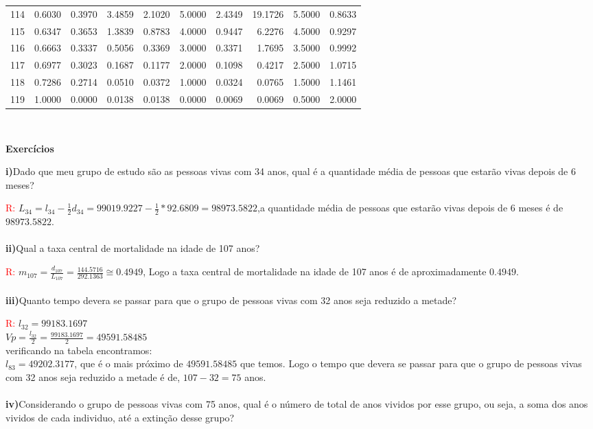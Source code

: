 \documentclass[11pt]{article}
\begin{document}
\begin{tabular}{|r|r|r|r|r|r|r|r|r|r|}
114 & 0.6030 & 0.3970 &      3.4859 &    2.1020 &   5.0000 &     2.4349 &       19.1726 &   5.5000 & 0.8633 \\
115 & 0.6347 & 0.3653 &      1.3839 &    0.8783 &   4.0000 &     0.9447 &        6.2276 &   4.5000 & 0.9297 \\
116 & 0.6663 & 0.3337 &      0.5056 &    0.3369 &   3.0000 &     0.3371 &        1.7695 &   3.5000 & 0.9992 \\
117 & 0.6977 & 0.3023 &      0.1687 &    0.1177 &   2.0000 &     0.1098 &        0.4217 &   2.5000 & 1.0715 \\
118 & 0.7286 & 0.2714 &      0.0510 &    0.0372 &   1.0000 &     0.0324 &        0.0765 &   1.5000 & 1.1461 \\
119 & 1.0000 & 0.0000 &      0.0138 &    0.0138 &   0.0000 &     0.0069 &        0.0069 &   0.5000 & 2.0000 \\
 	\hline
 \end{tabular}
 \\
 \begin{center}
	\textbf{Exercícios}
 \end{center}
 \textbf{i)}Dado que meu grupo de estudo são as pessoas vivas com 34 anos, qual é a quantidade média de pessoas que estarão vivas depois de 6 meses?
 
 \textcolor{red}{R:}
 $L_{34}=l_{34}-\frac{1}{2}d_{34}=99019.9227-\frac{1}{2}*92.6809=98973.5822$,a quantidade média de pessoas que estarão vivas depois de 6 meses é de $98973.5822$.\\
 \\
 \textbf{ii)}Qual a taxa central de mortalidade na idade de 107 anos?
 
 \textcolor{red}{R:}
 $m_{107}=\frac{d_{107}}{L_{107}}=\frac{144.5716}{292.1363}\cong0.4949$, Logo a taxa central de mortalidade na idade de 107 anos é de aproximadamente $0.4949$.\\
 \\
 \textbf{iii)}Quanto tempo devera se passar para que o grupo de pessoas vivas com 32 anos seja reduzido a metade?
 
 \textcolor{red}{R:}
 $l_{32}=99183.1697$\\
 $Vp=\frac{l_{32}}{2}=\frac{99183.1697}{2}=49591.58485$\\verificando na tabela encontramos:\\$l_{83}=49202.3177$, que é o mais próximo de $49591.58485$  que temos. Logo o tempo que devera se passar para que o grupo de pessoas vivas com 32 anos seja reduzido a metade é de, $107-32=75$ anos.\\
 \\
 \textbf{iv)}Considerando o grupo de pessoas vivas com 75 anos, qual é o número de total de anos vividos por esse grupo, ou seja, a soma dos anos vividos de cada individuo, até a extinção desse grupo?
 
\end{document}
